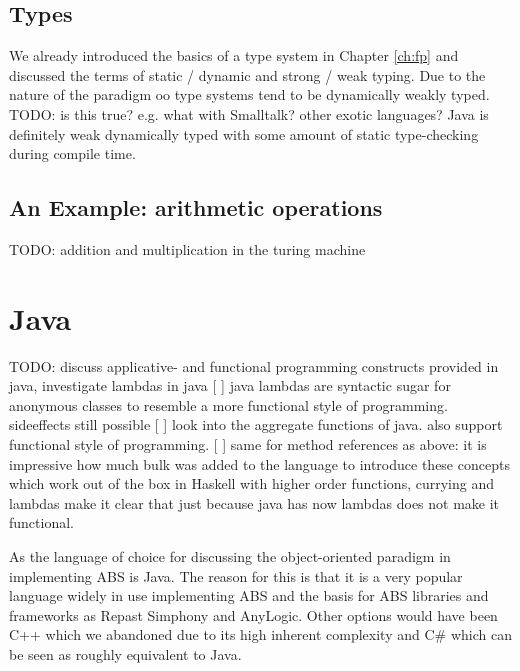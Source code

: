 \subsection{Types}
We already introduced the basics of a type system in Chapter \ref{ch:fp} and discussed the terms of static / dynamic and strong / weak typing. Due to the nature of the paradigm oo type systems tend to be dynamically weakly typed. TODO: is this true? e.g. what with Smalltalk? other exotic languages? Java is definitely weak dynamically typed with some amount of static type-checking during compile time.

\cite{abadi_theory_1996}

\subsection{An Example: arithmetic operations }
TODO: addition and multiplication in the turing machine

\section{Java}
TODO: discuss applicative- and functional programming constructs provided in java, investigate lambdas in java
[ ] java lambdas are syntactic sugar for anonymous classes to resemble a more functional style of programming. sideeffects still possible
[ ] look into the aggregate functions of java. also support functional style of programming.
[ ] same for method references as above: it is impressive how much bulk was added to the language to introduce these concepts which work out of the box in Haskell with higher order functions, currying and lambdas 
make it clear that just because java has now lambdas does not make it functional. 

As the language of choice for discussing the object-oriented paradigm in implementing ABS is Java. The reason for this is that it is a very popular language widely in use implementing ABS and the basis for ABS libraries and frameworks as Repast Simphony and AnyLogic. Other options would have been C++ which we abandoned due to its high inherent complexity and C\# which can be seen as roughly equivalent to Java.